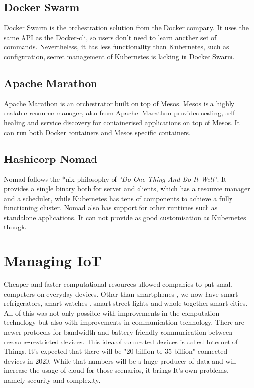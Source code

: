 \subsection*{Docker Swarm}
Docker Swarm is the orchestration solution from the Docker company. It uses the same API as the Docker-cli, so users don't need to learn another set of commands. Nevertheless, it has less functionality than Kubernetes, such as configuration, secret management of Kubernetes is lacking in Docker Swarm.

\subsection*{Apache Marathon}
Apache Marathon is an orchestrator built on top of Mesos. Mesos is a highly scalable resource manager, also from Apache. Marathon provides scaling, self-healing and service discovery for containerised applications on top of Mesos. It can run both Docker containers and Mesos specific containers.

\subsection*{Hashicorp Nomad}
Nomad follows the *nix philosophy of \textit{"Do One Thing And Do It Well"}. It provides a single binary both for server and clients, which has a resource manager and a scheduler, while Kubernetes has tens of components to achieve a fully functioning cluster. Nomad also has support for other runtimes such as standalone applications. It can not provide as good customisation as Kubernetes though.

\section{Managing IoT}
\iffalse
Cheaper and faster computational resources allowed companies to put small computers on everyday devices. Other than smartphones , we now have smart refrigerators, smart watches , smart street lights and whole together smart cities. All of this was not only possible with improvements in the computation technology but also with improvements in communication technology. There are newer protocols for bandwidth and battery friendly communication between resource-restricted devices. This idea of connected devices is called Internet of Things. It's expected that there will be "20 billion to 35 billion"\cite{unikernels-improve} connected devices in 2020. While that numbers will be a huge producer of data and will increase the usage of cloud for those scenarios, it brings It's own problems, namely security and complexity.


